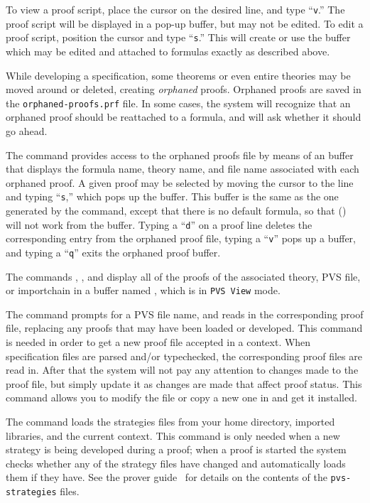 To view a proof script, place the cursor on the desired line, and type
``\texttt{v}.''  The proof script will be displayed in a pop-up buffer,
but may not be edited.  To edit a proof script, position the cursor and
type ``\texttt{s}.''  This will create or use the  buffer
which may be edited and attached to formulas exactly as described above.

While developing a specification, some theorems or even entire theories
may be moved around or deleted, creating \emph{orphaned}
proofs.  Orphaned proofs are saved in the
\texttt{orphaned-proofs.prf} file.  In some cases,
the system will recognize that an orphaned proof should be reattached to a
formula, and will ask whether it should go ahead.

The  command provides access to the orphaned
proofs file by means of an  buffer that displays the
formula name, theory name, and file name associated with each orphaned
proof.  A given proof may be selected by moving the cursor to the line and
typing ``\texttt{s},'' which pops up the  buffer.  This buffer
is the same as the one generated by the  command, except
that there is no default formula, so that  () will not work from the  buffer.  Typing a ``\texttt{d}''
on a proof line deletes the corresponding entry from the orphaned proof
file, typing a ``\texttt{v}'' pops up a  buffer, and
typing a ``\texttt{q}'' exits the orphaned proof buffer.

The commands , , and
 display all of the proofs of the associated
theory, PVS file, or importchain in a buffer named ,
which is in \texttt{PVS View} mode.

The  command prompts for a PVS file name, and
reads in the corresponding proof file, replacing any proofs that may have
been loaded or developed.  This command is needed in order to get a new
proof file accepted in a context.  When specification files are parsed
and/or typechecked, the corresponding proof files are read in.  After that
the system will not pay any attention to changes made to the proof file,
but simply update it as changes are made that affect proof status.  This
command allows you to modify the file or copy a new one in and get it
installed.

The  command loads the strategies files from your
home directory, imported libraries, and the current context.  This command
is only needed when a new strategy is being developed during a proof; when
a proof is started the system checks whether any of the strategy files
have changed and automatically loads them if they have.  See the prover
guide~\cite{PVS:prover} for details on the contents of the
\texttt{pvs-strategies} files.

